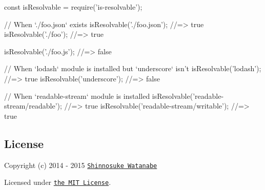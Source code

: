 \begin{DoxyCode}
const isResolvable = require('is-resolvable');

// When `./foo.json` exists
isResolvable('./foo.json'); //=> true
isResolvable('./foo'); //=> true

isResolvable('./foo.js'); //=> false


// When `lodash` module is installed but `underscore` isn't
isResolvable('lodash'); //=> true
isResolvable('underscore'); //=> false

// When `readable-stream` module is installed
isResolvable('readable-stream/readable'); //=> true
isResolvable('readable-stream/writable'); //=> true
\end{DoxyCode}


\subsection*{License}

Copyright (c) 2014 -\/ 2015 \href{https://github.com/shinnn}{\tt Shinnosuke Watanabe}

Licensed under \href{./LICENSE}{\tt the M\+IT License}. 
